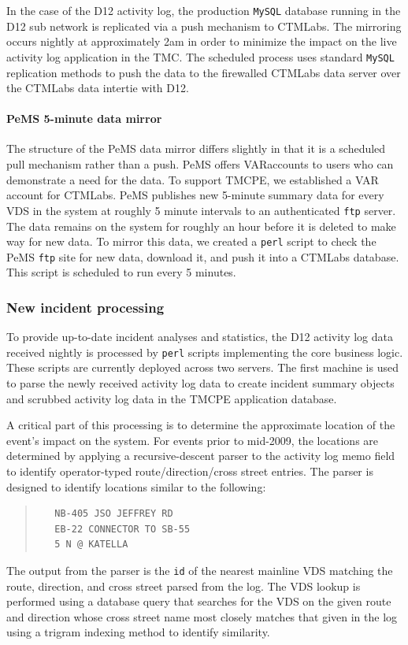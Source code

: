 \documentclass[12pt]{report}
\begin{document}
In the case of the \ac{D12} activity log, the production \texttt{MySQL} database
running in the \ac{D12} sub network is replicated via a push mechanism to
\ac{CTMLabs}.  The mirroring occurs nightly at approximately 2am in order to
minimize the impact on the live activity log application in the \ac{TMC}.  The
scheduled process uses standard \texttt{MySQL} replication methods to push the
data to the firewalled \ac{CTMLabs} data server over the \ac{CTMLabs} data
intertie with \ac{D12}.

\paragraph{PeMS 5-minute data mirror}

The structure of the \ac{PeMS} data mirror differs slightly in that it is a
scheduled pull mechanism rather than a push.  \ac{PeMS} offers \acf{VAR}accounts
to users who can demonstrate a need for the data.  To support \ac{TMCPE}, we
established a \ac{VAR} account for \ac{CTMLabs}.  \ac{PeMS} publishes new
5-minute summary data for every \ac{VDS} in the system at roughly 5 minute
intervals to an authenticated \texttt{ftp} server.  The data remains on the
system for roughly an hour before it is deleted to make way for new data.  To
mirror this data, we created a \texttt{perl} script to check the \ac{PeMS}
\texttt{ftp} site for new data, download it, and push it into a \ac{CTMLabs}
database.  This script is scheduled to run every 5 minutes.


\subsubsection{New incident processing}
\label{sec:incident-processing}

To provide up-to-date incident analyses and statistics, the \ac{D12} activity
log data received nightly is processed by \texttt{perl} scripts implementing the
core business logic.  These scripts are currently deployed across two servers.
The first machine is used to parse the newly received activity log data to
create incident summary objects and scrubbed activity log data in the \ac{TMCPE}
application database.

A critical part of this processing is to determine the approximate location of
the event's impact on the system.  For events prior to mid-2009, the locations
are determined by applying a recursive-descent parser to the activity log memo
field to identify operator-typed route/direction/cross street entries.  The
parser is designed to identify locations similar to the following:
\begin{quote}
\begin{verbatim}
   NB-405 JSO JEFFREY RD
   EB-22 CONNECTOR TO SB-55
   5 N @ KATELLA
\end{verbatim}
\end{quote}
The output from the parser is the \texttt{id} of the nearest mainline \ac{VDS}
matching the route, direction, and cross street parsed from the log.  The
\ac{VDS} lookup is performed using a database query that searches for the
\ac{VDS} on the given route and direction whose cross street name most closely
matches that given in the log using a trigram indexing method to identify
similarity.
\end{document}
